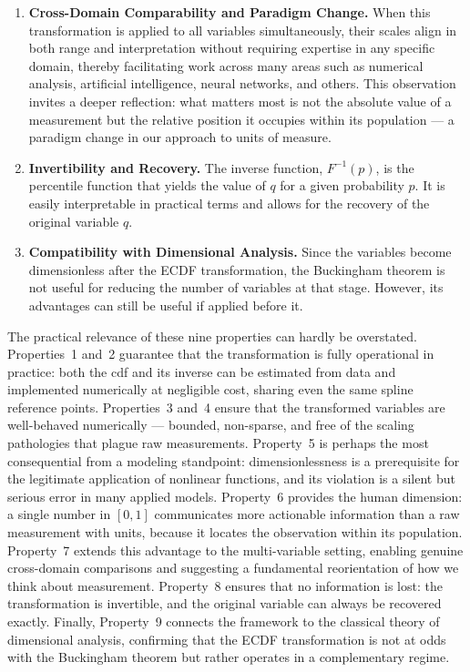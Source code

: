 \begin{enumerate}
\item \textbf{Cross-Domain Comparability and Paradigm Change.} When this transformation is applied to all variables simultaneously, their scales align in both range and interpretation without requiring expertise in any specific domain, thereby facilitating work across many areas such as numerical analysis, artificial intelligence, neural networks, and others. This observation invites a deeper reflection: what matters most is not the absolute value of a measurement but the relative position it occupies within its population — a paradigm change in our approach to units of measure.

\item \textbf{Invertibility and Recovery.} The inverse function, $F^{-1}(p)$, is the percentile function that yields the value of $q$ for a given probability $p$. It is easily interpretable in practical terms and allows for the recovery of the original variable $q$.

\item \textbf{Compatibility with Dimensional Analysis.} Since the variables become dimensionless after the ECDF transformation, the Buckingham theorem is not useful for reducing the number of variables at that stage. However, its advantages can still be useful if applied before it.
\end{enumerate}
\vspace{0.3cm}
\noindent The practical relevance of these nine properties can hardly be overstated. Properties~1 and~2
guarantee that the transformation is fully operational in practice: both the cdf and its inverse
can be estimated from data and implemented numerically at negligible cost, sharing even the same
spline reference points. Properties~3 and~4
ensure that the transformed variables are well-behaved numerically — bounded, non-sparse, and
free of the scaling pathologies that plague raw measurements. Property~5 is perhaps the most
consequential from a modeling standpoint: dimensionlessness is a prerequisite for the
legitimate application of nonlinear functions, and its violation is a silent but serious error
in many applied models. Property~6 provides the human dimension: a single number in $[0,1]$
communicates more actionable information than a raw measurement with units, because it locates
the observation within its population. Property~7 extends this advantage to the
multi-variable setting, enabling genuine cross-domain comparisons and suggesting a fundamental
reorientation of how we think about measurement. Property~8 ensures that no information is
lost: the transformation is invertible, and the original variable can always be recovered
exactly. Finally, Property~9 connects the framework to the classical theory of dimensional
analysis, confirming that the ECDF transformation is not at odds with the Buckingham
theorem but rather operates in a complementary regime.
\vspace{0.3cm}

